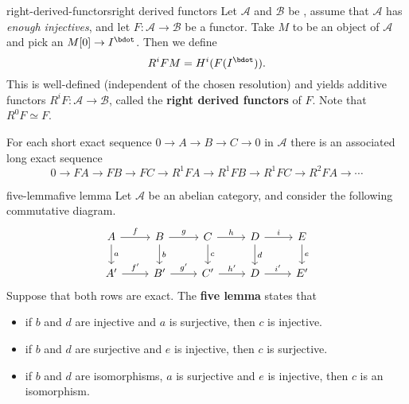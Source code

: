 \begin{topic}{right-derived-functors}{right derived functors}
    Let $\mathcal{A}$ and $\mathcal{B}$ be , assume that $\mathcal{A}$ has \textit{enough injectives}, and let $F : \mathcal{A} \to \mathcal{B}$ be a  functor. Take $M$ to be an object of $\mathcal{A}$ and pick an  $M[0] \to I^\bdot$. Then we define
    \[ R^i F M = H^i(F(I^\bdot)) . \]
    This is well-defined (independent of the chosen resolution) and yields additive functors $R^i F : \mathcal{A} \to \mathcal{B}$, called the \textbf{right derived functors} of $F$. Note that $R^0 F \simeq F$.
    
    For each short exact sequence $0 \to A \to B \to C \to 0$ in $\mathcal{A}$ there is an associated long exact sequence
    \[ 0 \to FA \to FB \to FC \to R^1FA \to R^1FB \to R^1FC \to R^2FA \to \cdots \]
\end{topic}

\begin{topic}{five-lemma}{five lemma}
    Let $\mathcal{A}$ be an abelian category, and consider the following commutative diagram.
    \[ \begin{tikzcd} A \arrow{r}{f} \arrow{d}{a} & B \arrow{r}{g} \arrow{d}{b} & C \arrow{r}{h} \arrow{d}{c} & D \arrow{r}{i} \arrow{d}{d} & E \arrow{d}{e} \\ A' \arrow{r}{f'} & B' \arrow{r}{g'} & C' \arrow{r}{h'} & D \arrow{r}{i'} & E' \end{tikzcd} \]
    Suppose that both rows are exact. The \textbf{five lemma} states that
    \begin{itemize}
        \item if $b$ and $d$ are injective and $a$ is surjective, then $c$ is injective.
        
        \item if $b$ and $d$ are surjective and $e$ is injective, then $c$ is surjective.
        
        \item if $b$ and $d$ are isomorphisms, $a$ is surjective and $e$ is injective, then $c$ is an isomorphism.
    \end{itemize}
\end{topic}

